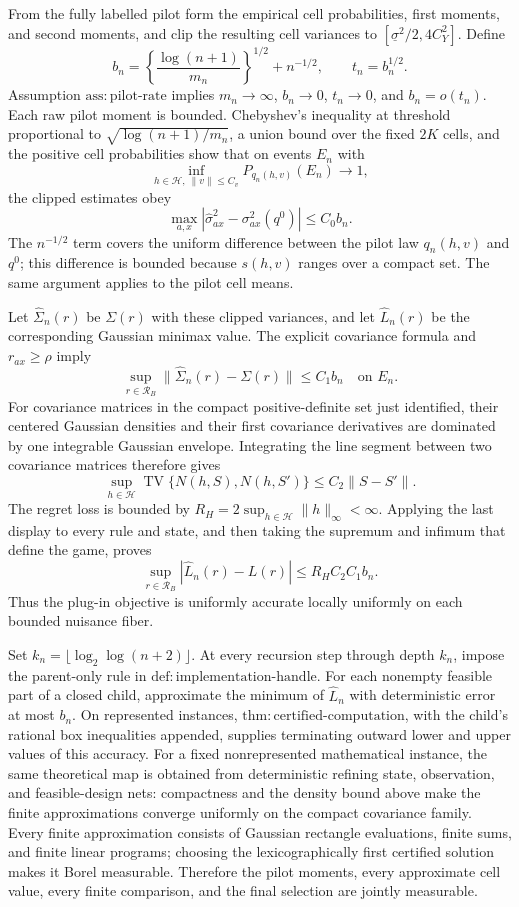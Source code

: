 From the fully labelled pilot form the empirical cell probabilities, first moments, and second moments, and clip the resulting cell variances to \([\underline\sigma^2/2,4C_Y^2]\).  Define
\[
b_n=\left\{\frac{\log(n+1)}{m_n}\right\}^{1/2}+n^{-1/2},
\qquad t_n=b_n^{1/2}.
\]
Assumption \(\mathrm{ass:pilot\text{-}rate}\) implies \(m_n\to\infty\), \(b_n\to0\), \(t_n\to0\), and \(b_n=o(t_n)\).  Each raw pilot moment is bounded.  Chebyshev's inequality at threshold proportional to \(\sqrt{\log(n+1)/m_n}\), a union bound over the fixed \(2K\) cells, and the positive cell probabilities show that on events \(E_n\) with
\[
\inf_{h\in\mathcal H,\ \lVert v\rVert\le C_v}
P_{q_n(h,v)}(E_n)\longrightarrow1,
\]
the clipped estimates obey
\[
\max_{a,x}|\widehat\sigma^2_{ax}-\sigma^2_{ax}(q^0)|\le C_0b_n.
\]
The \(n^{-1/2}\) term covers the uniform difference between the pilot law \(q_n(h,v)\) and \(q^0\); this difference is bounded because \(s(h,v)\) ranges over a compact set.  The same argument applies to the pilot cell means.

Let \(\widehat\Sigma_n(r)\) be \(\Sigma(r)\) with these clipped variances, and let \(\widehat L_n(r)\) be the corresponding Gaussian minimax value.  The explicit covariance formula and \(r_{ax}\ge\rho\) imply
\[
\sup_{r\in\mathcal R_B}
\lVert\widehat\Sigma_n(r)-\Sigma(r)\rVert\le C_1b_n
\quad\text{on }E_n.
\]
For covariance matrices in the compact positive-definite set just identified, their centered Gaussian densities and their first covariance derivatives are dominated by one integrable Gaussian envelope.  Integrating the line segment between two covariance matrices therefore gives
\[
\sup_{h\in\mathcal H}
\operatorname{TV}\{N(h,S),N(h,S')\}
\le C_2\lVert S-S'\rVert.
\]
The regret loss is bounded by
\(R_H=2\sup_{h\in\mathcal H}\lVert h\rVert_\infty<\infty\).  Applying the last display to every rule and state, and then taking the supremum and infimum that define the game, proves
\[
\sup_{r\in\mathcal R_B}|\widehat L_n(r)-L(r)|
\le R_HC_2C_1b_n.
\tag{1}
\]
Thus the plug-in objective is uniformly accurate locally uniformly on each bounded nuisance fiber.

Set \(k_n=\lfloor\log_2\log(n+2)\rfloor\).  At every recursion step through depth \(k_n\), impose the parent-only rule in \(\mathrm{def:implementation\text{-}handle}\).  For each nonempty feasible part of a closed child, approximate the minimum of \(\widehat L_n\) with deterministic error at most \(b_n\).  On represented instances, \(\mathrm{thm:certified\text{-}computation}\), with the child's rational box inequalities appended, supplies terminating outward lower and upper values of this accuracy.  For a fixed nonrepresented mathematical instance, the same theoretical map is obtained from deterministic refining state, observation, and feasible-design nets: compactness and the density bound above make the finite approximations converge uniformly on the compact covariance family.  Every finite approximation consists of Gaussian rectangle evaluations, finite sums, and finite linear programs; choosing the lexicographically first certified solution makes it Borel measurable.  Therefore the pilot moments, every approximate cell value, every finite comparison, and the final selection are jointly measurable.


